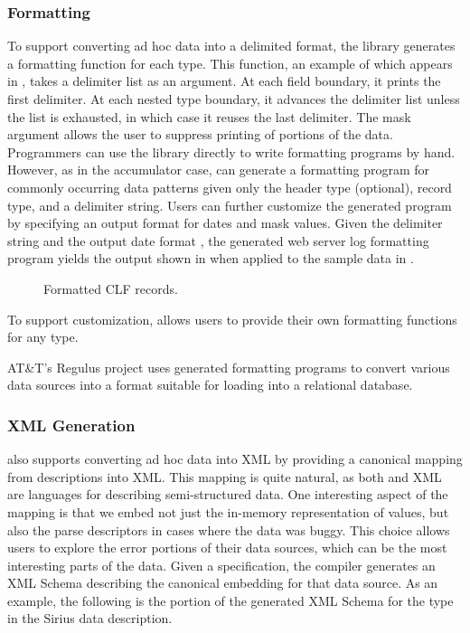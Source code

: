 \documentclass{sig-alternate}
\newcommand{\dibbler}{Sirius}
\newcommand{\darkstar}{Regulus}
\begin{document}
\subsubsection{Formatting}
To support converting ad hoc data into a delimited format, the \pads{}
library generates a formatting function for each type.  This function,
an example of which appears in , takes a delimiter
list as an argument.  At each field boundary, it prints the first delimiter.
At each nested type boundary, it advances the delimiter list unless the list
is exhausted, in which case it reuses the last delimiter.  The mask argument
allows the user to suppress printing of portions of the data.  Programmers
can use the library directly to write formatting programs by hand.  However, 
as in the accumulator case, \pads{} can generate a formatting program for 
commonly occurring data patterns given only the header type (optional), record type, and a delimiter string.  Users can further customize the generated program by specifying an output format for dates and mask values.   Given the delimiter
string  and the output date format , the generated
web server log formatting program yields
the output shown in  when applied to the
sample data in . 
\begin{figure*}
\begin{small}
\begin{center}
\begin{code}

\end{code}
\caption{Formatted CLF records.}
\label{figure:clf-records-formatted}
\end{center}
\end{small}
\end{figure*}
To support customization, \pads{} allows users to provide their own formatting functions for any type.

AT\&T's \darkstar{} project uses generated formatting programs to convert
various data sources into a format suitable for loading into a relational
database.

\subsubsection{XML Generation}
\pads{} also supports converting ad hoc data into XML by providing a canonical mapping from \pads{} descriptions into XML.  This mapping is quite natural, as both \pads{} and XML are languages for describing semi-structured data.
One interesting aspect of the mapping is that we embed not just the in-memory representation of \pads{} values, but also the parse descriptors in cases where the data was buggy.  This choice allows users to explore the error portions
of their data sources, which can be the most interesting parts of the data.
Given a \pads{} specification, the \pads{} compiler generates an XML Schema describing the canonical embedding for that data source.  As an example, 
the following is the portion of the generated XML Schema for the  type in the \dibbler{} data description.
\end{document}
